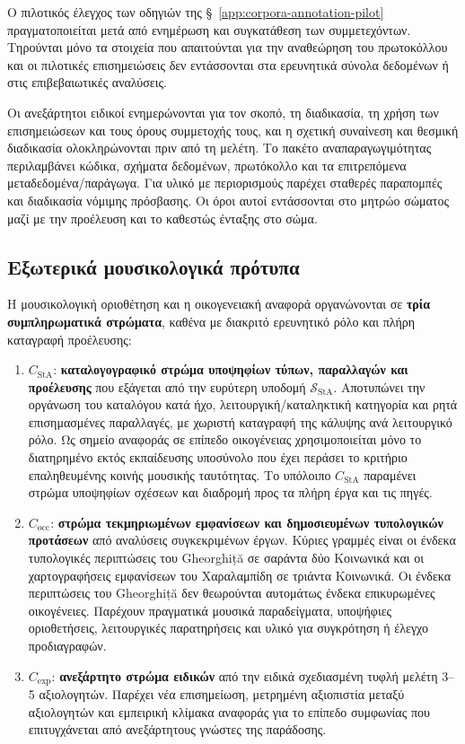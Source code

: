 \documentclass[11pt,a4paper]{article}
\begin{document}
Ο πιλοτικός έλεγχος των οδηγιών της §~\ref{app:corpora-annotation-pilot} πραγματοποιείται μετά από ενημέρωση και συγκατάθεση των συμμετεχόντων. Τηρούνται μόνο τα στοιχεία που απαιτούνται για την αναθεώρηση του πρωτοκόλλου και οι πιλοτικές επισημειώσεις δεν εντάσσονται στα ερευνητικά σύνολα δεδομένων ή στις επιβεβαιωτικές αναλύσεις.

Οι ανεξάρτητοι ειδικοί ενημερώνονται για τον σκοπό, τη διαδικασία, τη χρήση των επισημειώσεων και τους όρους συμμετοχής τους, και η σχετική συναίνεση και θεσμική διαδικασία ολοκληρώνονται πριν από τη μελέτη. Το πακέτο αναπαραγωγιμότητας περιλαμβάνει κώδικα, σχήματα δεδομένων, πρωτόκολλο και τα επιτρεπόμενα μεταδεδομένα/παράγωγα. Για υλικό με περιορισμούς παρέχει σταθερές παραπομπές και διαδικασία νόμιμης πρόσβασης. Οι όροι αυτοί εντάσσονται στο μητρώο σώματος μαζί με την προέλευση και το καθεστώς ένταξης στο σώμα.

\subsection{Εξωτερικά μουσικολογικά πρότυπα}\label{app:corpora-extrefs}

Η μουσικολογική οριοθέτηση και η οικογενειακή αναφορά οργανώνονται σε \textbf{τρία συμπληρωματικά στρώματα}, καθένα με διακριτό ερευνητικό ρόλο και πλήρη καταγραφή προέλευσης:

\begin{enumerate}
\item \(C_{\mathrm{StA}}\): \textbf{καταλογογραφικό στρώμα υποψηφίων τύπων, παραλλαγών και προέλευσης} που εξάγεται από την ευρύτερη υποδομή $\mathcal S_{\mathrm{StA}}$. Αποτυπώνει την οργάνωση του καταλόγου κατά ήχο, λειτουργική/καταληκτική κατηγορία και ρητά επισημασμένες παραλλαγές, με χωριστή καταγραφή της κάλυψης ανά λειτουργικό ρόλο. Ως σημείο αναφοράς σε επίπεδο οικογένειας χρησιμοποιείται μόνο το διατηρημένο εκτός εκπαίδευσης υποσύνολο που έχει περάσει το κριτήριο επαληθευμένης κοινής μουσικής ταυτότητας. Το υπόλοιπο $C_{\mathrm{StA}}$ παραμένει στρώμα υποψηφίων σχέσεων και διαδρομή προς τα πλήρη έργα και τις πηγές.
\item \(C_{\mathrm{occ}}\): \textbf{στρώμα τεκμηριωμένων εμφανίσεων και δημοσιευμένων τυπολογικών προτάσεων} από αναλύσεις συγκεκριμένων έργων. Κύριες γραμμές είναι οι ένδεκα τυπολογικές περιπτώσεις του Gheorghiță σε σαράντα δύο Κοινωνικά και οι χαρτογραφήσεις εμφανίσεων του Χαραλαμπίδη σε τριάντα Κοινωνικά. Οι ένδεκα περιπτώσεις του Gheorghiță δεν θεωρούνται αυτομάτως ένδεκα επικυρωμένες οικογένειες. Παρέχουν πραγματικά μουσικά παραδείγματα, υποψήφιες οριοθετήσεις, λειτουργικές παρατηρήσεις και υλικό για συγκρότηση ή έλεγχο προδιαγραφών.
\item \(C_{\mathrm{exp}}\): \textbf{ανεξάρτητο στρώμα ειδικών} από την ειδικά σχεδιασμένη τυφλή μελέτη 3--5 αξιολογητών. Παρέχει νέα επισημείωση, μετρημένη αξιοπιστία μεταξύ αξιολογητών και εμπειρική κλίμακα αναφοράς για το επίπεδο συμφωνίας που επιτυγχάνεται από ανεξάρτητους γνώστες της παράδοσης.
\end{enumerate}
\end{document}
